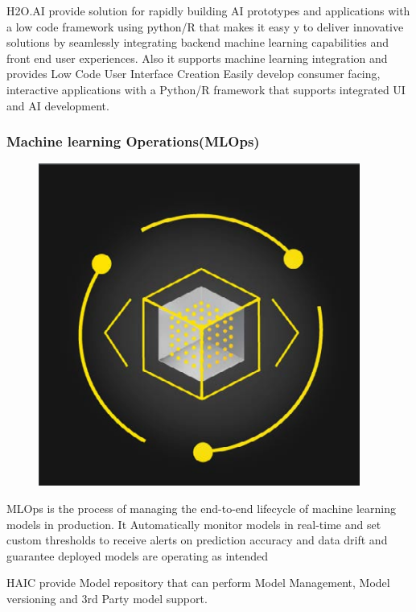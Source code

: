 \documentclass[12pt,a4paper]{report}
\begin{document}
H2O.AI provide solution for rapidly building AI prototypes and applications with a low code framework using python/R that makes 
it easy y to deliver innovative solutions by seamlessly integrating backend machine learning capabilities and front end user
experiences. Also it supports machine learning integration and provides Low Code User Interface Creation Easily develop consumer
facing, interactive applications
with a Python/R framework that
supports integrated UI and AI
development.
\\

\subsubsection{Machine learning Operations(MLOps)}
\begin{figure}
\includegraphics[width=1\linewidth]{mlops.png}
\end{figure}

MLOps is the process of managing the end-to-end lifecycle of machine learning models in production. It Automatically monitor models in real-time
and set custom thresholds to receive alerts on prediction accuracy and data drift and guarantee deployed models are operating
as intended

HAIC provide Model repository that can perform Model Management, Model versioning and 3rd Party model support.
\end{document}
